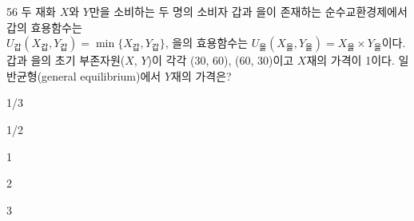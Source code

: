 \begin{question}{56}
두 재화 $X$와 $Y$만을 소비하는 두 명의 소비자 갑과 을이 존재하는 순수교환경제에서 갑의 효용함수는 \\
$U_{\text{갑}}(X_{\text{갑}}, Y_{\text{갑}}) = \min\{X_{\text{갑}}, Y_{\text{갑}}\}$, 을의 효용함수는 $U_{\text{을}}(X_{\text{을}}, Y_{\text{을}}) = X_{\text{을}} \times Y_{\text{을}}$이다. 갑과 을의 초기 부존자원($X$, $Y$)이 각각 (30, 60), (60, 30)이고 $X$재의 가격이 1이다. 일반균형(general equilibrium)에서 $Y$재의 가격은?
\begin{choices}
  \item 1/3
  \item 1/2
  \item 1
  \item 2
  \item 3
\end{choices}
\end{question}
